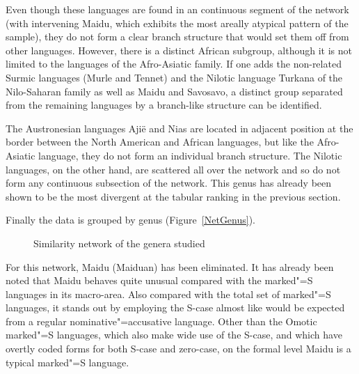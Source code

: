 Even though these languages are found in an continuous segment of the network (with intervening Maidu, which exhibits the most areally atypical pattern of the sample), they do not form a clear branch structure that would set them off from other languages. 
However, there is a distinct African subgroup, although it is not limited to the languages of the Afro-Asiatic family. 
If one adds the non-related Surmic languages (Murle and Tennet) and the Nilotic language Turkana of the Nilo-Saharan family as well as Maidu and Savosavo, a distinct group separated from the remaining languages by a branch-like structure can be identified. 

The Austronesian languages Aji\"e and Nias are located in adjacent position at the border between the North American and African languages, but like the Afro-Asiatic language, they do not form an individual branch structure.
The Nilotic languages, on the other hand, are scattered all over the network and so do not form any continuous subsection of the network.
This genus has already been shown to be the most divergent at the tabular ranking in the previous section.


Finally the data is grouped by genus (Figure~\vref{NetGenus}). 
\begin{figure}[h,t,b,p] \centering {}%
\caption{Similarity network of the genera studied}\label{NetGenus}
\end{figure}
For this network, Maidu (Maiduan) has been eliminated.
It has already been noted that Maidu behaves quite unusual compared with the marked"=S languages in its macro-area.
Also compared with the total set of marked"=S languages, it stands out by employing the S-case almost like would be expected from a regular nominative"=accusative language. 
Other than the Omotic marked"=S languages, which also make wide use of the S-case, and which have overtly coded forms for both S-case and zero-case, on the formal level Maidu is a typical marked"=S language. 

